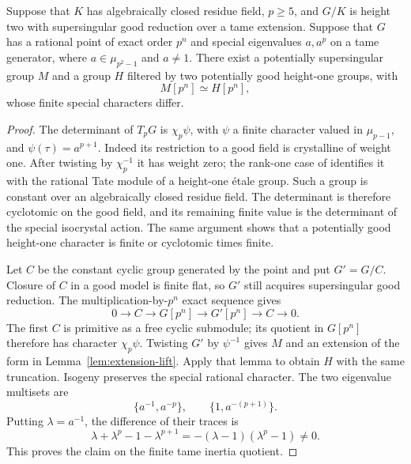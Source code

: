 \begin{lemma}\label{lem:point-ambiguity}
Suppose that $K$ has algebraically closed residue field, $p\ge5$, and $G/K$ is height two with supersingular good reduction over a tame extension. Suppose that $G$ has a rational point of exact order $p^n$ and special eigenvalues $a,a^p$ on a tame generator, where $a\in\mu_{p^2-1}$ and $a\ne1$. There exist a potentially supersingular group $M$ and a group $H$ filtered by two potentially good height-one groups, with
\[
                         M[p^n]\simeq H[p^n],
\]
whose finite special characters differ.
\end{lemma}
\begin{proof}
The determinant of $T_pG$ is $\chi_p\psi$, with $\psi$ a finite character valued in $\mu_{p-1}$, and $\psi(\tau)=a^{p+1}$. Indeed its restriction to a good field is crystalline of weight one. After twisting by $\chi_p^{-1}$ it has weight zero; the rank-one case of \citet[Corollary~2.2.6, p.~26 of the author version]{Kisin2006} identifies it with the rational Tate module of a height-one \'etale group. Such a group is constant over an algebraically closed residue field. The determinant is therefore cyclotomic on the good field, and its remaining finite value is the determinant of the special isocrystal action. The same argument shows that a potentially good height-one character is finite or cyclotomic times finite.

Let $C$ be the constant cyclic group generated by the point and put $G'=G/C$. Closure of $C$ in a good model is finite flat, so $G'$ still acquires supersingular good reduction. The multiplication-by-$p^n$ exact sequence gives
\[
 0\longrightarrow C\longrightarrow G[p^n]
       \longrightarrow G'[p^n]\longrightarrow C\longrightarrow0.
\]
The first $C$ is primitive as a free cyclic submodule; its quotient in $G[p^n]$ therefore has character $\chi_p\psi$. Twisting $G'$ by $\psi^{-1}$ gives $M$ and an extension of the form in Lemma~\ref{lem:extension-lift}. Apply that lemma to obtain $H$ with the same truncation. Isogeny preserves the special rational character. The two eigenvalue multisets are
\[
               \{a^{-1},a^{-p}\},\qquad\{1,a^{-(p+1)}\}.
\]
Putting $\lambda=a^{-1}$, the difference of their traces is
\[
                 \lambda+\lambda^p-1-\lambda^{p+1}
                              =-(\lambda-1)(\lambda^p-1)\ne0.
\]
This proves the claim on the finite tame inertia quotient.
\end{proof}

